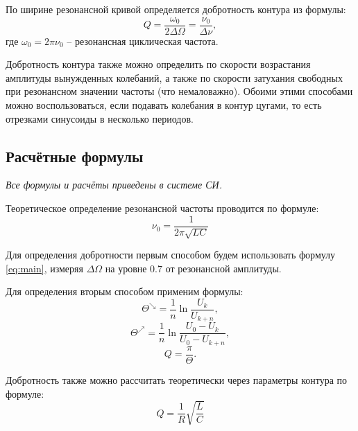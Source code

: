\documentclass{lab}
\begin{document}
По ширине резонансной кривой определяется добротность контура из формулы:
\begin{equation}
    Q = \frac{\omega_0}{2 \Delta \Omega} = \frac{\nu_0}{\Delta \nu},
    \label{eq:main}
\end{equation}
где $ \omega_0 = 2 \pi \nu_0 $ -- резонансная циклическая частота.

Добротность контура также можно определить по скорости возрастания амплитуды вынужденных колебаний, а также по скорости затухания свободных при резонансном значении частоты (что немаловажно). Обоими этими способами можно воспользоваться, если подавать колебания в контур цугами, то есть отрезками синусоиды в несколько периодов.

\subsection{Расчётные формулы}

\emph{Все формулы и расчёты приведены в системе СИ.}

Теоретическое определение резонансной частоты проводится по формуле:
\begin{equation}\label{nu}
    \nu_0 = \frac{1}{2 \pi \sqrt{L C}}
\end{equation}

Для определения добротности первым способом будем использовать формулу \ref{eq:main}, измеряя $ \Delta \Omega $ на уровне 0.7 от резонансной амплитуды.

Для определения вторым способом применим формулы:
\begin{equation}
    \Theta^\searrow = \frac{1}{n} \ln \frac{U_k}{U_{k+n}},
\end{equation}
\begin{equation}
    \Theta^\nearrow = \frac{1}{n} \ln \frac{U_0 - U_k}{U_0 - U_{k+n}},
\end{equation}
\begin{equation}
    Q = \frac{\pi}{\Theta}.
\end{equation}

Добротность также можно рассчитать теоретически через параметры контура по формуле:
\begin{equation}\label{teor}
    Q = \frac{1}{R } \sqrt{\frac{L}{C}}
\end{equation}
\end{document}
